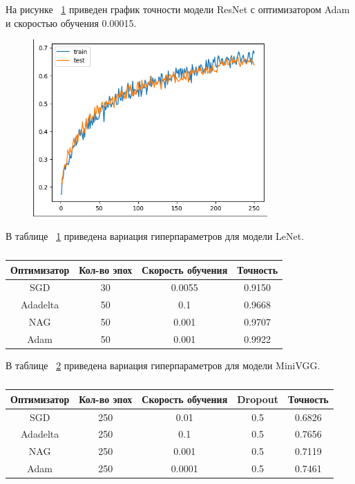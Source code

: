 \documentclass[a4paper, 14pt]{extarticle}
\begin{document}
На рисунке ~\ref{fig:img12} приведен график точности модели ResNet с оптимизатором Adam и скоростью обучения 0.00015.

\begin{figure}[H]
\centering
\includegraphics[width=0.8\textwidth]{images/res12.png}
\caption{}
\label{fig:img12}
\end{figure}

В таблице ~\ref{tab1:LeNet} приведена вариация гиперпараметров для модели LeNet.

\begin{table}[h]
\centering
\caption{}
\label{tab1:LeNet}
\begin{tabular}{|c|c|c|c|}
  \hline
  Оптимизатор & Кол-во эпох  & Скорость обучения & Точность \\
  \hline
  SGD & 30 & 0.0055 & 0.9150 \\
  \hline
  Adadelta & 50 & 0.1 & 0.9668 \\
  \hline
  NAG & 50 & 0.001 & 0.9707 \\
  \hline
  Adam & 50 & 0.001 & 0.9922 \\
  \hline
\end{tabular}
\end{table}

В таблице ~\ref{tab2:VGG} приведена вариация гиперпараметров для модели MiniVGG.

\begin{table}[h]
\centering
\caption{}
\label{tab2:VGG}
\begin{tabular}{|c|c|c|c|c|}
  \hline
  Оптимизатор & Кол-во эпох  & Скорость обучения & Dropout & Точность \\
  \hline
  SGD & 250 & 0.01 & 0.5 & 0.6826 \\
  \hline
  Adadelta & 250 & 0.1 & 0.5 & 0.7656 \\
  \hline
  NAG & 250 & 0.001 & 0.5 & 0.7119 \\
  \hline
  Adam & 250 & 0.0001 & 0.5 & 0.7461 \\
  \hline
\end{tabular}
\end{table}
\end{document}
